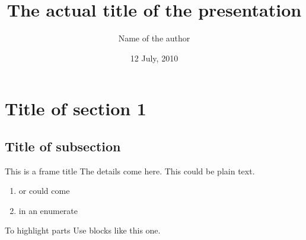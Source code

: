 \documentclass[10pt]{beamer}
\title[Title to appear at the bottom] %
{The actual title of the presentation}
\subtitle
{}
\author %
{Name of the author}
\institute %
{
  University of Oxford
  }
\date %
{12 July, 2010}
\begin{document}
\begin{frame}
  \titlepage
\end{frame}







\section{Title of section 1}
\subsection{Title of subsection}
\begin{frame}{This is a frame title}
The details come here. This could be plain text. 
\begin{enumerate}
\item or could come
\item in an enumerate
\end{enumerate}

\begin{block}{To highlight parts}
Use blocks like this one.
\end{block}

\end{frame}
\end{document}
